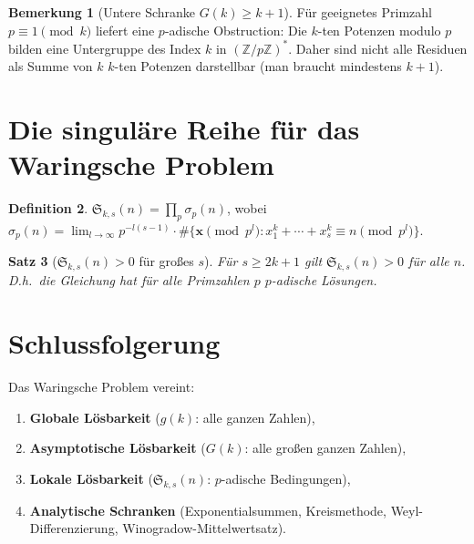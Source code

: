 \documentclass[12pt,a4paper]{amsart}
\newtheorem{theorem}{Satz}[section]
\theoremstyle{definition}
\newtheorem{definition}[theorem]{Definition}
\newtheorem{bemerkung}[theorem]{Bemerkung}
\newcommand{\Z}{\mathbb{Z}}
\begin{document}
\begin{bemerkung}[Untere Schranke $G(k) \geq k+1$]
  Für geeignetes Primzahl $p \equiv 1 \pmod k$ liefert eine
  $p$-adische Obstruction: Die $k$-ten Potenzen modulo $p$ bilden eine
  Untergruppe des Index $k$ in $(\Z/p\Z)^*$.  Daher sind nicht alle
  Residuen als Summe von $k$ $k$-ten Potenzen darstellbar (man braucht
  mindestens $k+1$).
\end{bemerkung}

\section{Die singuläre Reihe für das Waringsche Problem}
\label{sec:sing_reihe}

\begin{definition}
  $\mathfrak{S}_{k,s}(n) = \prod_p \sigma_p(n)$, wobei
  $\sigma_p(n) = \lim_{l\to\infty} p^{-l(s-1)}
  \cdot \#\{\mathbf{x} \pmod{p^l}: x_1^k+\cdots+x_s^k \equiv n \pmod{p^l}\}$.
\end{definition}

\begin{theorem}[$\mathfrak{S}_{k,s}(n) > 0$ für großes $s$]\label{thm:sing_pos}
  Für $s \geq 2k+1$ gilt $\mathfrak{S}_{k,s}(n) > 0$ für alle $n$.
  D.h.\ die Gleichung hat für alle Primzahlen $p$ $p$-adische Lösungen.
\end{theorem}

\section{Schlussfolgerung}

Das Waringsche Problem vereint:
\begin{enumerate}
  \item \textbf{Globale Lösbarkeit} ($g(k)$: alle ganzen Zahlen),
  \item \textbf{Asymptotische Lösbarkeit} ($G(k)$: alle großen ganzen Zahlen),
  \item \textbf{Lokale Lösbarkeit} ($\mathfrak{S}_{k,s}(n)$: $p$-adische Bedingungen),
  \item \textbf{Analytische Schranken} (Exponentialsummen, Kreismethode,
    Weyl-Differenzierung, Winogradow-Mittelwertsatz).
\end{enumerate}
\end{document}

